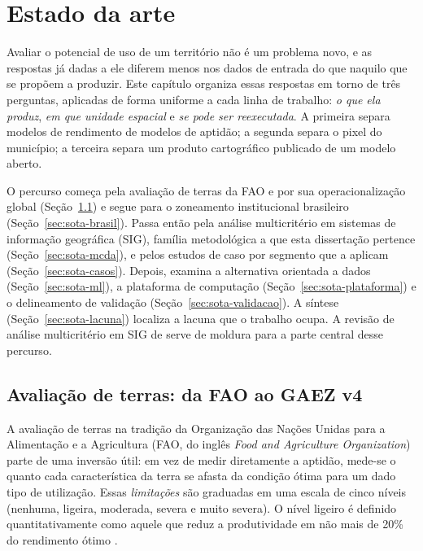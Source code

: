 \chapter{Estado da arte}\label{ch:sota}

Avaliar o potencial de uso de um território não é um problema novo, e as respostas já dadas a ele
diferem menos nos dados de entrada do que naquilo que se propõem a produzir. Este capítulo organiza
essas respostas em torno de três perguntas, aplicadas de forma uniforme a cada linha de trabalho:
\emph{o que ela produz}, \emph{em que unidade espacial} e \emph{se pode ser reexecutada}. A primeira separa modelos
de rendimento de modelos de aptidão; a segunda separa o pixel do município; a terceira separa um
produto cartográfico publicado de um modelo aberto.

O percurso começa pela avaliação de terras da FAO e por sua operacionalização global
(Seção~\ref{sec:sota-fao}) e segue para o zoneamento institucional brasileiro (Seção~\ref{sec:sota-brasil}).
Passa então pela análise multicritério em sistemas de informação geográfica (SIG), família metodológica
a que esta dissertação pertence (Seção~\ref{sec:sota-mcda}), e pelos estudos de caso por segmento que a
aplicam (Seção~\ref{sec:sota-casos}). Depois, examina a alternativa orientada a dados
(Seção~\ref{sec:sota-ml}), a plataforma de computação (Seção~\ref{sec:sota-plataforma}) e o delineamento
de validação (Seção~\ref{sec:sota-validacao}). A síntese (Seção~\ref{sec:sota-lacuna}) localiza a
lacuna que o trabalho ocupa. A revisão de análise multicritério em SIG de \citet{malczewski_gisbased_2006}
serve de moldura para a parte central desse percurso.

\section{Avaliação de terras: da FAO ao GAEZ v4}\label{sec:sota-fao}

A avaliação de terras na tradição da Organização das Nações Unidas para a Alimentação e a Agricultura
(FAO, do inglês \emph{Food and Agriculture Organization}) parte de uma inversão útil: em vez de medir
diretamente a aptidão, mede-se o quanto cada característica da terra se afasta da condição ótima para um
dado tipo de utilização. Essas \emph{limitações} são graduadas em uma escala de cinco níveis (nenhuma,
ligeira, moderada, severa e muito severa). O nível ligeiro é definido quantitativamente como aquele que
reduz a produtividade em não mais de 20\% do rendimento ótimo \citep[p.~61]{sys_land_1991}.

